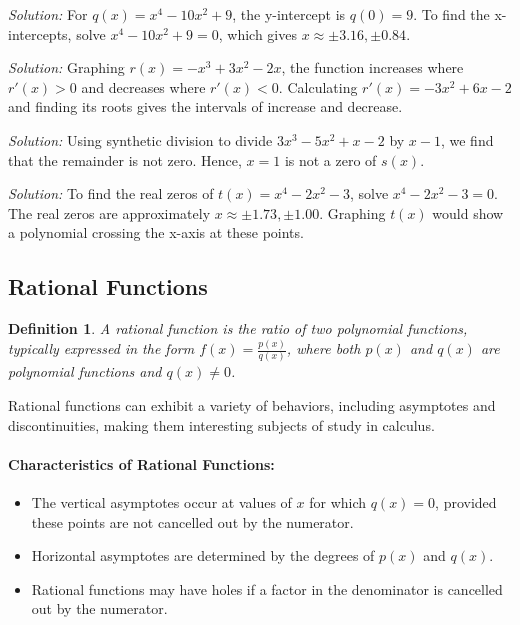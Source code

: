 \documentclass[a4paper,12pt]{book}
\newenvironment{solution}[1][]
{\par\noindent\textit{Solution:} \rmfamily}{\medskip}
\newtheorem{definition}{Definition}
\begin{document}
\begin{solution}[7]
For \( q(x) = x^4 - 10x^2 + 9 \), the y-intercept is \( q(0) = 9 \). To find the x-intercepts, solve \( x^4 - 10x^2 + 9 = 0 \), which gives \( x \approx \pm 3.16, \pm 0.84 \).
\end{solution}

\begin{solution}[8]
Graphing \( r(x) = -x^3 + 3x^2 - 2x \), the function increases where \( r'(x) > 0 \) and decreases where \( r'(x) < 0 \). Calculating \( r'(x) = -3x^2 + 6x - 2 \) and finding its roots gives the intervals of increase and decrease.
\end{solution}

\begin{solution}[9]
Using synthetic division to divide \( 3x^3 - 5x^2 + x - 2 \) by \( x - 1 \), we find that the remainder is not zero. Hence, \( x = 1 \) is not a zero of \( s(x) \).
\end{solution}

\begin{solution}[10]
To find the real zeros of \( t(x) = x^4 - 2x^2 - 3 \), solve \( x^4 - 2x^2 - 3 = 0 \). The real zeros are approximately \( x \approx \pm 1.73, \pm 1.00 \). Graphing \( t(x) \) would show a polynomial crossing the x-axis at these points.
\end{solution}


\subsection{Rational Functions}
\begin{definition}
A rational function is the ratio of two polynomial functions, typically expressed in the form \( f(x) = \frac{p(x)}{q(x)} \), where both \( p(x) \) and \( q(x) \) are polynomial functions and \( q(x) \neq 0 \).
\end{definition}

Rational functions can exhibit a variety of behaviors, including asymptotes and discontinuities, making them interesting subjects of study in calculus.

\paragraph{Characteristics of Rational Functions:}
\begin{itemize}
    \item The vertical asymptotes occur at values of \( x \) for which \( q(x) = 0 \), provided these points are not cancelled out by the numerator.
    \item Horizontal asymptotes are determined by the degrees of \( p(x) \) and \( q(x) \).
    \item Rational functions may have holes if a factor in the denominator is cancelled out by the numerator.
\end{itemize}
\end{document}
